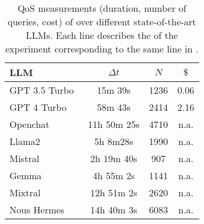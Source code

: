 \begin{table}
    \caption[\llmfkg{}  measurements]{%
        \Gls{QoS} measurements (duration, number of queries, cost) of \llmfkg{} over different state-of-the-art LLMs.
        Each line describes the  of the experiment corresponding to the same line in .
    }
    \centering
    \begin{tabular}{l | c c c} \toprule
        LLM & $\mathit{\Delta t}$ & $\mathit{N}$ & $\$$
        \\ \midrule
        GPT 3.5 Turbo~\cite{gpt3-2020} & 15m 39s & 1236 & 0.06
        \\
        GPT 4 Turbo~\cite{gpt4} & 58m 43s & 2414 & 2.16
        \\ \midrule
        Openchat~\cite{wang2023openchat} & 11h 50m 25s & 4710 & n.a.
        \\
        Llama2~\cite{llama2} & 5h 8m28s & 1990 & n.a.
        \\
        Mistral~\cite{mistral} & 2h 19m 40s & 907 & n.a.
        \\
        Gemma~\cite{gemini} & 4h 55m 2s & 1141 & n.a.
        \\ \midrule
        Mixtral~\cite{mixtral} & 12h 51m 2s & 2620 & n.a.
        \\
        Nous Hermes & 14h 40m 3s & 6083 & n.a.
        \\ \bottomrule
    \end{tabular}
    \label{tab:kgfiller-qos}
\end{table}